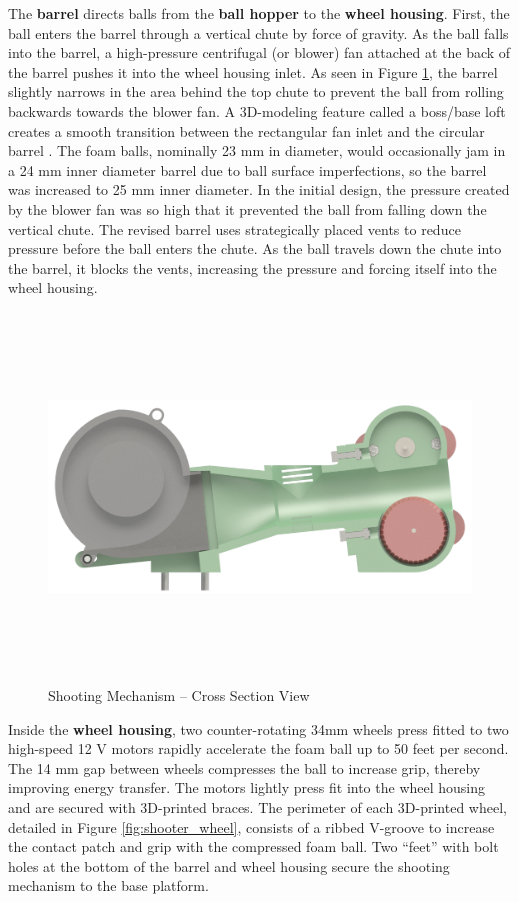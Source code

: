 The \textbf{barrel} directs balls from the \textbf{ball hopper} to the \textbf{wheel housing}. First, the ball enters the barrel through a vertical chute by force of gravity. As the ball falls into the barrel, a high-pressure centrifugal (or blower) fan attached at the back of the barrel pushes it into the wheel housing inlet. As seen in Figure \ref{fig:shooter_xsec}, the barrel slightly narrows in the area behind the top chute to prevent the ball from rolling backwards towards the blower fan. A 3D-modeling feature called a boss/base loft creates a smooth transition between the rectangular fan inlet and the circular barrel \cite{zuyderduyn_2016}. The foam balls, nominally 23 mm in diameter, would occasionally jam in a 24 mm inner diameter barrel due to ball surface imperfections, so the barrel was increased to 25 mm inner diameter. In the initial design, the pressure created by the blower fan was so high that it prevented the ball from falling down the vertical chute. The revised barrel uses strategically placed vents to reduce pressure before the ball enters the chute. As the ball travels down the chute into the barrel, it blocks the vents, increasing the pressure and forcing itself into the wheel housing.

\begin{figure}[H]   %
	\centering \includegraphics[width=6in, height=3.85in, keepaspectratio]{figures/shooter_xsec.png}
	\caption{Shooting Mechanism -- Cross Section View}	\label{fig:shooter_xsec}
\end{figure}

Inside the \textbf{wheel housing}, two counter-rotating 34mm wheels press fitted to two high-speed 12 V motors rapidly accelerate the foam ball up to 50 feet per second. The 14 mm gap between wheels compresses the ball to increase grip, thereby improving energy transfer. The motors lightly press fit into the wheel housing and are secured with 3D-printed braces. The perimeter of each 3D-printed wheel, detailed in Figure \ref{fig:shooter_wheel}, consists of a ribbed V-groove to increase the contact patch and grip with the compressed foam ball. Two ``feet'' with bolt holes at the bottom of the barrel and wheel housing secure the shooting mechanism to the base platform.

